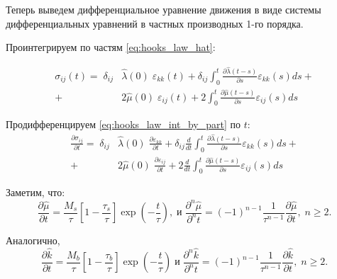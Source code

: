 \documentclass[a4paper, fontsize=14pt]{article}
\begin{document}
Теперь выведем дифференциальное уравнение движения в виде системы дифференциальных уравнений в частных производных 1-го порядка.

Проинтегрируем по частям \eqref{eq:hooks_law_hat}:

\begin{equation}
    \label{eq:hooks_law_int_by_part}
    \begin{aligned}
        \sigma_{ij}(t) = \; \delta_{ij} & \hat{\lambda}(0) \; \varepsilon_{kk}(t) + \delta_{ij} \int_0^t \frac{\partial \hat{\lambda}(t - s)}{\partial s}  \varepsilon_{kk}(s) ds + \\
        + & 2 \hat{\mu}(0) \; \varepsilon_{ij}(t) + 2 \int_0^t \frac{\partial \hat{\mu}(t - s)}{\partial s}  \varepsilon_{ij}(s) ds 
    \end{aligned}
\end{equation}

Продифференцируем \eqref{eq:hooks_law_int_by_part} по $t$:
\begin{equation}
    \label{eq:hooks_law_int_by_part_differentiate}
    \begin{aligned}
        \frac{\partial \sigma_{ij}}{\partial t}  = \; \delta_{ij} & \hat{\lambda}(0) \; \frac{\partial \varepsilon_{kk}}{\partial t}  + \delta_{ij} \frac{d}{dt} \int_0^t \frac{\partial \hat{\lambda}(t - s)}{\partial s}  \varepsilon_{kk}(s) ds + \\
        + & 2 \hat{\mu}(0) \; \frac{\partial \varepsilon_{ij}}{\partial t} + 2 \frac{d}{dt} \int_0^t \frac{\partial \hat{\mu}(t - s)}{\partial s}  \varepsilon_{ij}(s) ds 
    \end{aligned}
\end{equation}

Заметим, что:
\begin{equation}
    \label{eq:mu_t}
    \frac{\partial \hat{\mu}}{\partial t} = \frac{M_s}{\tau} \left[1 - \frac{\tau_s}{\tau} \right] \exp \left( - \frac{t}{\tau}\right), \; \text{и} \;  \frac{\partial^n \hat{\mu}}{\partial^n t} = (-1)^{n - 1} \frac{1}{\tau^{n-1}} \frac{\partial \hat{\mu}}{\partial t}, \; n \geq 2. 
\end{equation}

Аналогично,
\begin{equation}
    \label{eq:k_t}
    \frac{\partial \hat{k}}{\partial t} = \frac{M_b}{\tau} \left[1 - \frac{\tau_b}{\tau} \right] \exp \left( - \frac{t}{\tau}\right)  \; \text{и} \;  \frac{\partial^n \hat{k}}{\partial^n t} = (-1)^{n - 1} \frac{1}{\tau^{n-1}} \frac{\partial \hat{k}}{\partial t}, \; n \geq 2. 
\end{equation}
\end{document}
